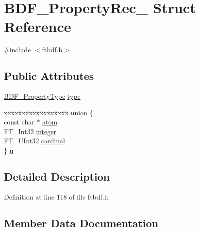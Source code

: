\hypertarget{struct_b_d_f___property_rec__}{}\section{B\+D\+F\+\_\+\+Property\+Rec\+\_\+ Struct Reference}
\label{struct_b_d_f___property_rec__}


{\ttfamily \#include $<$ftbdf.\+h$>$}

\subsection*{Public Attributes}
\begin{DoxyCompactItemize}
\item 
\mbox{\hyperlink{ftbdf_8h_a3e95a243aac87978075ca8b42635a0b2}{B\+D\+F\+\_\+\+Property\+Type}} \mbox{\hyperlink{struct_b_d_f___property_rec___a88c19ee6f16bd1b36127f5f7d44a4e39}{type}}
\item 
\begin{tabbing}
xx\=xx\=xx\=xx\=xx\=xx\=xx\=xx\=xx\=\kill
union \{\\
\>const char $\ast$ \mbox{\hyperlink{struct_b_d_f___property_rec___aa8d56dc848d8a2c8e2f7e40a63f5d032}{atom}}\\
\>FT\_Int32 \mbox{\hyperlink{struct_b_d_f___property_rec___a71243b414ad203fd7d6d2468c39bbd79}{integer}}\\
\>FT\_UInt32 \mbox{\hyperlink{struct_b_d_f___property_rec___adaba2e4ce8da90a5ea59080a0521d332}{cardinal}}\\
\} \mbox{\hyperlink{struct_b_d_f___property_rec___aa9ff7a27d6fbd9e8045e6cc10f736dfe}{u}}\\

\end{tabbing}\end{DoxyCompactItemize}


\subsection{Detailed Description}


Definition at line 118 of file ftbdf.\+h.



\subsection{Member Data Documentation}
\mbox{\label{struct_b_d_f___property_rec___aa8d56dc848d8a2c8e2f7e40a63f5d032}} 
